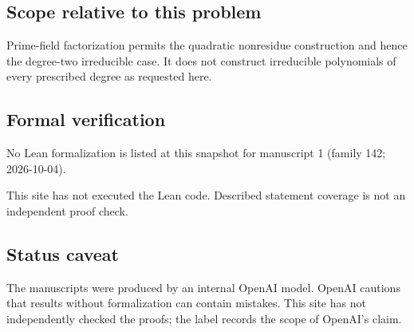 \documentclass[11pt]{article}
\begin{document}
\subsection{Scope relative to this problem}
Prime-field factorization permits the quadratic nonresidue construction and hence the degree-two irreducible case. It does not construct irreducible polynomials of every prescribed degree as requested here.

\subsection{Formal verification}
No Lean formalization is listed at this snapshot for manuscript 1 (family 142; 2026-10-04).

This site has not executed the Lean code. Described statement coverage is not an independent proof check.

\subsection{Status caveat}
The manuscripts were produced by an internal OpenAI model. OpenAI cautions that results without formalization can contain mistakes. This site has not independently checked the proofs; the label records the scope of OpenAI's claim.
\end{document}
